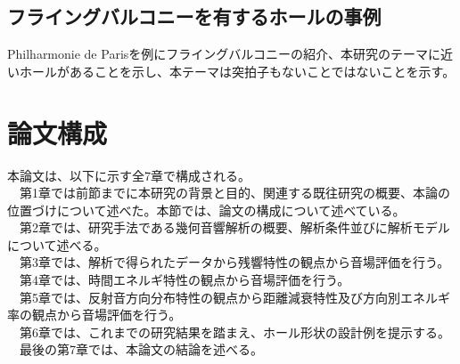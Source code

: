 \subsection{フライングバルコニーを有するホールの事例}
Philharmonie de Parisを例にフライングバルコニーの紹介、本研究のテーマに近いホールがあることを示し、本テーマは突拍子もないことではないことを示す。

\section{論文構成}
本論文は、以下に示す全7章で構成される。
\\　第1章では前節までに本研究の背景と目的、関連する既往研究の概要、本論の位置づけについて述べた。本節では、論文の構成について述べている。
\\　第2章では、研究手法である幾何音響解析の概要、解析条件並びに解析モデルについて述べる。
\\　第3章では、解析で得られたデータから残響特性の観点から音場評価を行う。
\\　第4章では、時間エネルギ特性の観点から音場評価を行う。
\\　第5章では、反射音方向分布特性の観点から距離減衰特性及び方向別エネルギ率の観点から音場評価を行う。
\\　第6章では、これまでの研究結果を踏まえ、ホール形状の設計例を提示する。
\\　最後の第7章では、本論文の結論を述べる。
